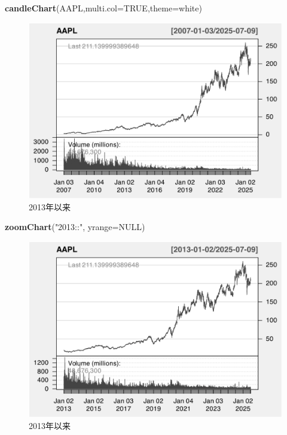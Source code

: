 \documentclass[]{ctexbook}
\newenvironment{Shaded}{\begin{snugshade}}{\end{snugshade}}
\newcommand{\AttributeTok}[1]{\textcolor[rgb]{0.13,0.29,0.53}{#1}}
\newcommand{\ConstantTok}[1]{\textcolor[rgb]{0.56,0.35,0.01}{#1}}
\newcommand{\FunctionTok}[1]{\textcolor[rgb]{0.13,0.29,0.53}{\textbf{#1}}}
\newcommand{\NormalTok}[1]{#1}
\newcommand{\StringTok}[1]{\textcolor[rgb]{0.31,0.60,0.02}{#1}}
\begin{document}
\begin{Shaded}
\begin{Highlighting}[]
\FunctionTok{candleChart}\NormalTok{(AAPL,}\AttributeTok{multi.col=}\ConstantTok{TRUE}\NormalTok{,}\AttributeTok{theme=}\StringTok{\textquotesingle{}white\textquotesingle{}}\NormalTok{) }
\end{Highlighting}
\end{Shaded}

\begin{figure}
\includegraphics[width=0.9\linewidth]{quantmod_files/figure-latex/zoomYear-1} \caption{2013年以来}\label{fig:zoomYear-1}
\end{figure}

\begin{Shaded}
\begin{Highlighting}[]
\FunctionTok{zoomChart}\NormalTok{(}\StringTok{"2013::"}\NormalTok{, }\AttributeTok{yrange=}\ConstantTok{NULL}\NormalTok{)}
\end{Highlighting}
\end{Shaded}

\begin{figure}
\includegraphics[width=0.9\linewidth]{quantmod_files/figure-latex/zoomYear-2} \caption{2013年以来}\label{fig:zoomYear-2}
\end{figure}
\end{document}

